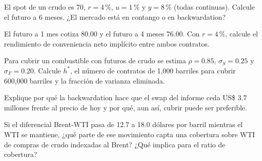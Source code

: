 \ejercicio[cálculo] El spot de un crudo es 70, $r=4\,\%$, $u=1\,\%$ y $y=8\,\%$ (todas continuas). Calcule el futuro a 6 meses. ¿El mercado está en contango o en backwardation?

\ejercicio[cálculo] El futuro a 1 mes cotiza 80.00 y el futuro a 4 meses 76.00. Con $r=4\,\%$, calcule el rendimiento de conveniencia neto implícito entre ambos contratos.

\ejercicio[cálculo] Para cubrir un combustible con futuros de crudo se estima $\rho=0.85$, $\sigma_S=0.25$ y $\sigma_F=0.20$. Calcule $h^*$, el número de contratos de 1,000 barriles para cubrir 600,000 barriles y la fracción de varianza eliminada.

\ejercicio[conceptual] Explique por qué la backwardation hace que el swap del informe ceda US\$ 3.7 millones frente al precio de hoy y por qué, aun así, cubrir puede ser preferible.

\ejercicio[conceptual] Si el diferencial Brent-WTI pasa de 12.7 a 18.0 dólares por barril mientras el WTI se mantiene, ¿qué parte de ese movimiento capta una cobertura sobre WTI de compras de crudo indexadas al Brent? ¿Qué implica para el ratio de cobertura?
